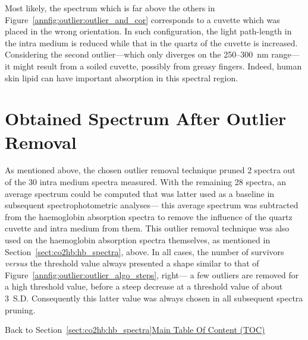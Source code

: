 Most likely, the spectrum which is far above the others in Figure~\ref{annfig:outlier:outlier_and_cor} corresponds to a cuvette which was placed in the wrong orientation. In such configuration, the light path-length in the intra medium is reduced while that in the quartz of the cuvette is increased. Considering the second outlier---which only diverges on the 250--300~nm range---it might result from a soiled cuvette, possibly from greasy fingers. Indeed, human skin lipid can have important absorption in this spectral region\cite{beadle1981}.

\section{Obtained Spectrum After Outlier Removal}

As mentioned above, the chosen outlier removal technique pruned 2 spectra out of the 30 intra medium spectra measured. With the remaining 28 spectra, an average spectrum could be computed that was latter used as a baseline in subsequent spectrophotometric analyses---\ie{} this average spectrum was subtracted from the haemoglobin absorption spectra to remove the influence of the quartz cuvette and intra medium from them. This outlier removal technique was also used on the haemoglobin absorption spectra themselves, as mentioned in Section~\ref{sect:co2hb:hb_spectra}, above. In all cases, the number of survivors \textit{versus} the threshold value always presented a shape similar to that of Figure~\ref{annfig:outlier:outlier_algo_steps}, right---\ie{} a few outliers are removed for a high threshold value, before a steep decrease at a threshold value of about 3~S.D. Consequently this latter value was always chosen in all subsequent spectra pruning.

\begin{appbox}
	Back to Section~\ref{sect:co2hb:hb_spectra}\hfill \hyperref[chapter:toc]{Main Table Of Content (TOC)}
\end{appbox}